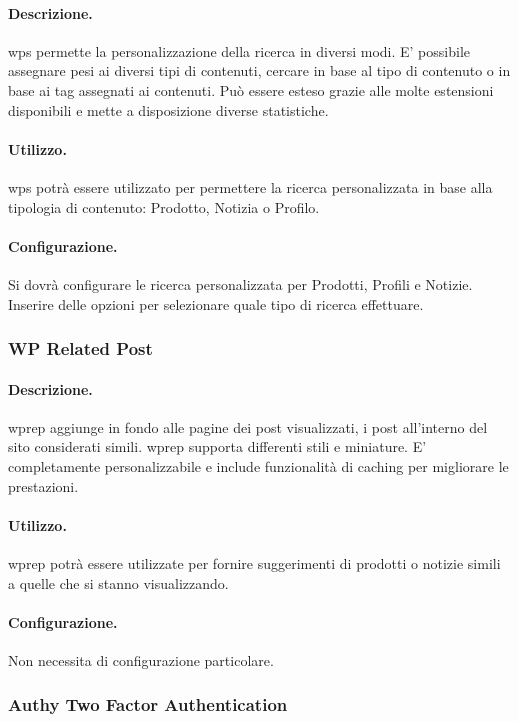 \paragraph{Descrizione.} \gls{wps} permette la personalizzazione della ricerca in diversi modi. E' possibile assegnare pesi ai diversi tipi di contenuti, cercare in base al tipo di contenuto o in base ai tag assegnati ai contenuti. Può essere esteso grazie alle molte estensioni disponibili e mette a disposizione diverse statistiche.
\paragraph{Utilizzo.} \gls{wps} potrà essere utilizzato per permettere la ricerca personalizzata in base alla tipologia di contenuto: Prodotto, Notizia o Profilo.
\paragraph{Configurazione.} Si dovrà configurare le ricerca personalizzata per Prodotti, Profili e Notizie. Inserire delle opzioni per selezionare quale tipo di ricerca effettuare.

\subsubsection{WP Related Post} \label{plugin:wprep}
\paragraph{Descrizione.} \gls{wprep} aggiunge in fondo alle pagine dei post visualizzati, i post all'interno del sito considerati simili. \gls{wprep} supporta differenti stili e miniature. E' completamente personalizzabile e include funzionalità di caching per migliorare le prestazioni.
\paragraph{Utilizzo.} \gls{wprep} potrà essere utilizzate per fornire suggerimenti di prodotti o notizie simili a quelle che si stanno visualizzando.
\paragraph{Configurazione.} Non necessita di configurazione particolare.

\subsubsection{Authy Two Factor Authentication} \label{plugin:atfa}
